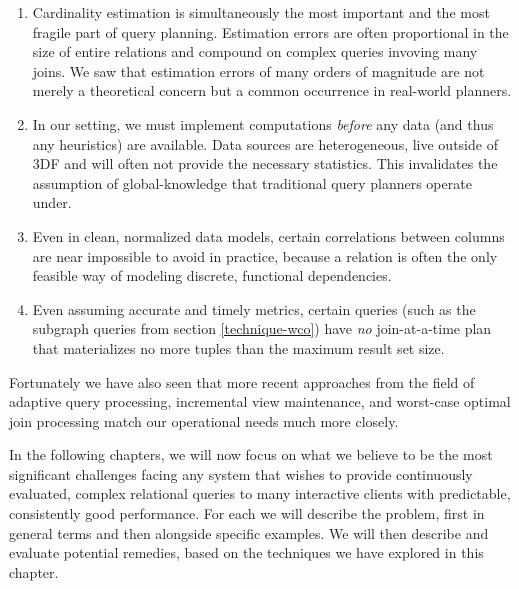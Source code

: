 \documentclass[../index.tex]{subfiles}
\begin{document}
\begin{enumerate}
  \item
    Cardinality estimation is simultaneously the most important and
    the most fragile part of query planning. Estimation errors are
    often proportional in the size of entire relations and compound on
    complex queries invoving many joins. We saw that estimation errors
    of many orders of magnitude are not merely a theoretical concern
    but a common occurrence in real-world planners.

  \item
    In our setting, we must implement computations \emph{before} any
    data (and thus any heuristics) are available. Data sources are
    heterogeneous, live outside of 3DF and will often not provide the
    necessary statistics. This invalidates the assumption of
    global-knowledge that traditional query planners operate under.

  \item
    Even in clean, normalized data models, certain correlations
    between columns are near impossible to avoid in practice, because
    a relation is often the only feasible way of modeling discrete,
    functional dependencies.

  \item
    Even assuming accurate and timely metrics, certain queries (such
    as the subgraph queries from section \ref{technique-wco}) have
    \emph{no} join-at-a-time plan that materializes no more tuples
    than the maximum result set size.
\end{enumerate}

Fortunately we have also seen that more recent approaches from the
field of adaptive query processing, incremental view maintenance, and
worst-case optimal join processing match our operational needs much
more closely.

In the following chapters, we will now focus on what we believe to be
the most significant challenges facing any system that wishes to
provide continuously evaluated, complex relational queries to many
interactive clients with predictable, consistently good
performance. For each we will describe the problem, first in general
terms and then alongside specific examples. We will then describe and
evaluate potential remedies, based on the techniques we have explored
in this chapter.
\end{document}
